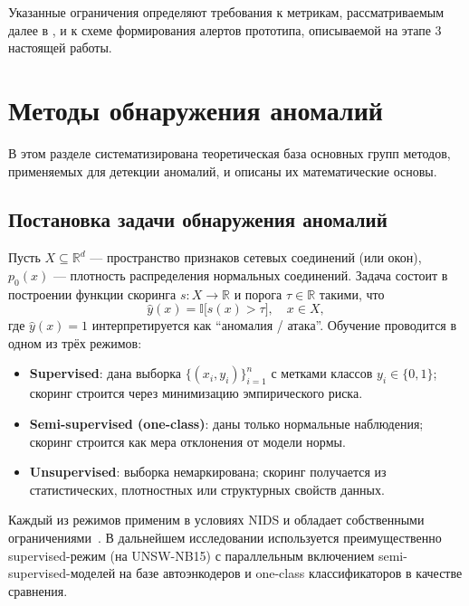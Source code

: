Указанные ограничения определяют требования к метрикам, рассматриваемым далее в
, и к схеме формирования алертов прототипа, описываемой на
этапе 3 настоящей работы.

\section{Методы обнаружения аномалий}

В этом разделе систематизирована теоретическая база основных групп методов,
применяемых для детекции аномалий, и описаны их математические основы.

\subsection{Постановка задачи обнаружения аномалий}

Пусть \(X \subseteq \mathbb{R}^d\) --- пространство признаков сетевых соединений
(или окон), \(p_{0}(x)\) --- плотность распределения нормальных соединений.
Задача состоит в построении функции скоринга \(s\colon X \to \mathbb{R}\) и
порога \(\tau \in \mathbb{R}\) такими, что
\begin{equation}
\hat{y}(x) = \mathbb{I}\bigl[s(x) > \tau\bigr],
\quad x \in X,
\label{eq:detector}
\end{equation}
где \(\hat{y}(x) = 1\) интерпретируется как ``аномалия / атака''.
Обучение проводится в одном из трёх режимов:

\begin{itemize}
    \item \textbf{Supervised}: дана выборка \(\{(x_i, y_i)\}_{i=1}^{n}\) с
    метками классов \(y_i \in \{0,1\}\); скоринг строится через минимизацию
    эмпирического риска.
    \item \textbf{Semi-supervised (one-class)}: даны только нормальные
    наблюдения; скоринг строится как мера отклонения от модели нормы.
    \item \textbf{Unsupervised}: выборка немаркирована; скоринг получается из
    статистических, плотностных или структурных свойств данных.
\end{itemize}

Каждый из режимов применим в условиях NIDS и обладает собственными
ограничениями~\cite{khraisat2019survey, sommer2010outside}. В дальнейшем
исследовании используется преимущественно supervised-режим (на UNSW-NB15) с
параллельным включением semi-supervised-моделей на базе автоэнкодеров и
one-class классификаторов в качестве сравнения.

